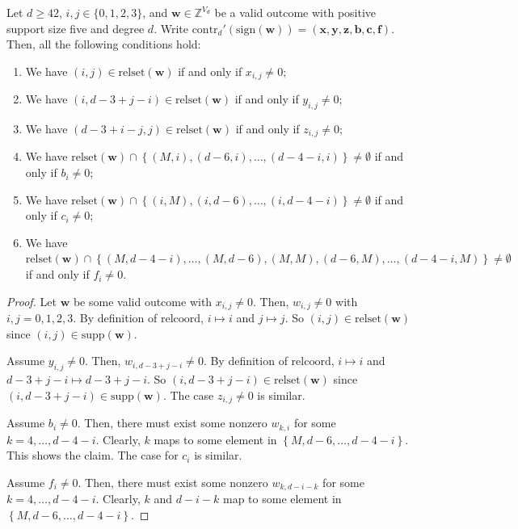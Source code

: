 \begin{proposition}\label{prop:iewjri3j3234212121112}
    Let \( d \geq 42 \), \( i,j \in \{ 0,1,2,3 \} \), and \( \mathbf{w} \in \mathbb{Z}^{V_d} \) be a valid outcome with positive support size five and degree \( d \). Write \( \mathrm{contr}_d'(\mathrm{sign}(\mathbf{w})) = (\mathbf{x},\mathbf{y},\mathbf{z},\mathbf{b},\mathbf{c},\mathbf{f} ) \). Then, all the following conditions hold:
    \begin{enumerate}
        \item We have \( (i,j) \in \mathrm{relset}(\mathbf{w}) \) if and only if \( x_{i,j} \neq 0 \);
        \item We have \( (i, d-3+j-i) \in \mathrm{relset}(\mathbf{w}) \) if and only if \( y_{i,j} \neq 0 \);
        \item We have \( (d-3+i-j,j) \in \mathrm{relset}(\mathbf{w}) \) if and only if \( z_{i,j} \neq 0 \);
        \item We have \( \mathrm{relset}(\mathbf{w}) \cap \left\{ (M,i), (d-6, i), \dots, (d-4-i, i) \right\} \neq \emptyset \) if and only if \( b_i \neq 0 \);
        \item We have \( \mathrm{relset}(\mathbf{w}) \cap \left\{ (i,M), (i, d-6), \dots, (i,d-4-i) \right\} \neq \emptyset \) if and only if \( c_i \neq 0 \);
        \item We have \( \mathrm{relset}(\mathbf{w}) \cap \left\{ (M, d-4-i), \dots, (M, d-6), (M,M), (d-6, M), \dots, (d-4-i, M) \right\} \neq \emptyset \) if and only if \( f_i \neq 0 \).
    \end{enumerate}
\end{proposition}

\begin{proof}
    Let \( \mathbf{w} \) be some valid outcome with \( x_{i,j} \neq 0 \). Then, \( w_{i,j} \neq 0 \) with \( i,j = 0, 1,2, 3 \). By definition of \( \mathrm{relcoord} \), \( i \mapsto i \) and \( j \mapsto j \). So \( (i,j) \in \mathrm{relset}(\mathbf{w}) \) since \( (i,j) \in \mathrm{supp}(\mathbf{w}) \).

    Assume \( y_{i,j} \neq 0 \). Then, \( w_{i, d-3+j-i} \neq 0 \). By definition of \( \mathrm{relcoord} \), \( i \mapsto i \) and \( d-3+j-i \mapsto d-3+j-i \). So \( (i,d-3+j-i) \in \mathrm{relset}(\mathbf{w}) \) since \( (i,d-3+j-i) \in \mathrm{supp}(\mathbf{w}) \). The case \( z_{i,j} \neq 0 \) is similar.

    Assume \( b_{i} \neq 0 \). Then, there must exist some nonzero \( w_{k, i} \) for some \( k = 4, \dots, d-4-i \). Clearly, \( k \) maps to some element in \( \left\{ M, d-6, \dots, d-4-i \right\} \). This shows the claim. The case for \( c_i \) is similar.

    Assume \( f_{i} \neq 0 \). Then, there must exist some nonzero \( w_{k, d-i-k} \) for some \( k = 4, \dots, d-4-i \). Clearly, \( k \) and \( d-i-k \)  map to some element in \( \left\{ M, d-6, \dots, d-4-i \right\} \).
\end{proof}

